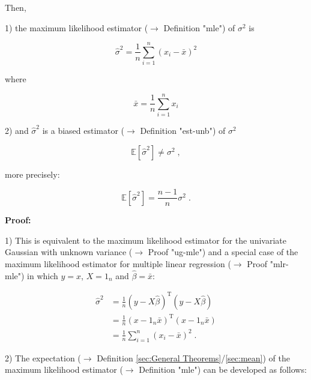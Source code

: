 \documentclass[a4paper,12pt]{book}
\begin{document}
Then,

1) the maximum likelihood estimator ($\rightarrow$ Definition "mle") of $\sigma^2$ is

\begin{equation} \label{eq:resvar-bias-resvar-mle}
\hat{\sigma}^2 = \frac{1}{n} \sum_{i=1}^{n} \left( x_i - \bar{x} \right)^2
\end{equation}

where

\begin{equation} \label{eq:resvar-bias-mean-mle}
\bar{x} = \frac{1}{n} \sum_{i=1}^{n} x_i
\end{equation}

2) and $\hat{\sigma}^2$ is a biased estimator ($\rightarrow$ Definition "est-unb") of $\sigma^2$

\begin{equation} \label{eq:resvar-bias-resvar-var}
\mathbb{E}\left[ \hat{\sigma}^2 \right] \neq \sigma^2 \; ,
\end{equation}

more precisely:

\begin{equation} \label{eq:resvar-bias-resvar-bias}
\mathbb{E}\left[ \hat{\sigma}^2 \right] = \frac{n-1}{n} \sigma^2 \; .
\end{equation}


\vspace{1em}
\textbf{Proof:}

1) This is equivalent to the maximum likelihood estimator for the univariate Gaussian with unknown variance ($\rightarrow$ Proof "ug-mle") and a special case of the maximum likelihood estimator for multiple linear regression ($\rightarrow$ Proof "mlr-mle") in which $y = x$, $X = 1_n$ and $\hat{\beta} = \bar{x}$:

\begin{equation} \label{eq:resvar-bias-resvar-mle-qed}
\begin{split}
\hat{\sigma}^2 &= \frac{1}{n} (y-X\hat{\beta})^\mathrm{T} (y-X\hat{\beta}) \\
&= \frac{1}{n} (x - 1_n \bar{x})^\mathrm{T} (x - 1_n \bar{x}) \\
&= \frac{1}{n} \sum_{i=1}^{n} \left( x_i - \bar{x} \right)^2 \; .
\end{split}
\end{equation}

2) The expectation ($\rightarrow$ Definition \ref{sec:General Theorems}/\ref{sec:mean}) of the maximum likelihood estimator ($\rightarrow$ Definition "mle") can be developed as follows:
\end{document}
